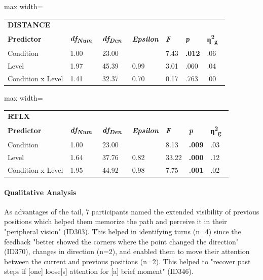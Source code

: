 \documentclass[sigconf]{nimeart}
\begin{document}
\begin{table}[htbp]\centering\small
\begin{adjustbox}{max width=\textwidth}\begin{tabular}{lllllll}
\toprule
\midrule
\multicolumn{7}{l}{%
\textbf{DISTANCE}} \\
\textbf{Predictor} & \textbf{\emph{df}}\textsubscript{\textbf{\emph{Num~}}} & \textbf{\emph{df}}\textsubscript{\textbf{\emph{Den~}}} & \textbf{\emph{Epsilon}} & \textbf{\emph{F}} & \textbf{\emph{p}} & \textbf{η}\textsuperscript{\textbf{2}}\textsubscript{\textbf{g~}} \\
Condition & 1.00 & 23.00 & 
 & 7.43 & \textbf{.012} & .06 \\
Level & 1.97 & 45.39 & 0.99 & 3.01 & .060 & .04 \\
Condition x Level & 1.41 & 32.37 & 0.70 & 0.17 & .763 & .00 \\
\bottomrule
\end{tabular}\end{adjustbox}\end{table}

\begin{table}[htbp]\centering\small
\begin{adjustbox}{max width=\textwidth}\begin{tabular}{lllllll}
\toprule
\midrule
\multicolumn{7}{l}{%
\textbf{RTLX}} \\
\textbf{Predictor} & \textbf{\emph{df}}\textsubscript{\textbf{\emph{Num~}}} & \textbf{\emph{df}}\textsubscript{\textbf{\emph{Den~}}} & \textbf{\emph{Epsilon}} & \textbf{\emph{F}} & \textbf{\emph{p}} & \textbf{η}\textsuperscript{\textbf{2}}\textsubscript{\textbf{g~}} \\
Condition & 1.00 & 23.00 & 
 & 8.13 & \textbf{.009} & .03 \\
Level & 1.64 & 37.76 & 0.82 & 33.22 & \textbf{.000} & .12 \\
Condition x Level & 1.95 & 44.92 & 0.98 & 7.75 & \textbf{.001} & .02 \\
\bottomrule
\end{tabular}\end{adjustbox}\end{table}

\paragraph{Qualitative Analysis}\label{qualitative-analysis-1}

As advantages of the tail, 7 participants named the extended visibility of previous positions which helped them memorize the path and perceive it in their "peripheral vision" (ID303). This helped in identifying turns (n=4) since the feedback "better showed the corners where the point changed the direction" (ID370), changes in direction (n=2), and enabled them to move their attention between the current and previous positions (n=2). This helped to "recover past steps if {[}one{]} loose{[}s{]} attention for {[}a{]} brief moment" (ID346).
\end{document}

